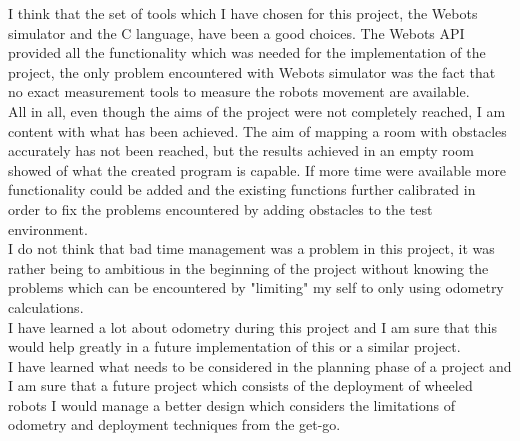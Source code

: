 I think that the set of tools which I have chosen for this project, the Webots\textsuperscript{\texttrademark} simulator and the C language, have been a good choices. 
The Webots\textsuperscript{\texttrademark} API provided all the functionality which was needed for the implementation of the project,  the only problem encountered with Webots\textsuperscript{\texttrademark} simulator was the fact that no exact measurement tools to measure the robots movement are available. \\[3ex]

All in all, even though the aims of the project were not completely reached, I am content with what has been achieved. 
The aim of mapping a room with obstacles accurately has not been reached, but the results achieved in an empty room showed of what the created program is capable. 
If more time were available more functionality could be added and the existing functions further calibrated in order to fix the problems encountered by adding obstacles to the test environment. \\
I do not think that bad time management was a problem in this project, it was rather being to ambitious in the beginning of the project without knowing the problems which can be encountered by "limiting" my self to only using odometry calculations. \\[3ex]

I have learned a lot about odometry during this project and I am sure that this would help greatly in a future implementation of this or a similar project. \\
I have learned what needs to be considered in the planning phase of a project and I am sure that a future project which consists of the deployment of wheeled robots I would manage a better design which considers the limitations of odometry and deployment techniques from the get-go.




